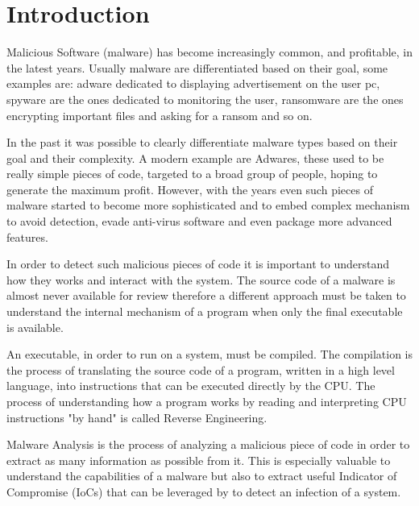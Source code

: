 \chapter{Introduction}

Malicious Software (malware) has become increasingly common, and profitable, in the latest years. Usually malware are differentiated based on their goal, some examples are: adware dedicated to displaying advertisement on the user pc, spyware are the ones dedicated to monitoring the user, ransomware are the ones encrypting important files and asking for a ransom and so on. 

In the past it was possible to clearly differentiate malware types based on their goal and their complexity. A modern example are Adwares, these used to be really simple pieces of code, targeted to a broad group of people, hoping to generate the maximum profit. However, with the years even such pieces of malware started to become more sophisticated and to embed complex mechanism to avoid detection, evade anti-virus software and even package more advanced features\cite{bitdef}.

In order to detect such malicious pieces of code it is important to understand how they works and interact with the system. The source code of a malware is almost never available for review therefore a different approach must be taken to understand the internal mechanism of a program when only the final executable is available. 

An executable, in order to run on a system, must be compiled. The compilation is the process of translating the source code of a program, written in a high level language, into instructions that can be executed directly by the CPU. The process of understanding how a program works by reading and interpreting CPU instructions "by hand" is called Reverse Engineering.

Malware Analysis is the process of analyzing a malicious piece of code in order to extract as many information as possible from it. This is especially valuable to understand the capabilities of a malware but also to extract useful Indicator of Compromise (IoCs) that can be leveraged by to detect an infection of a system. 

